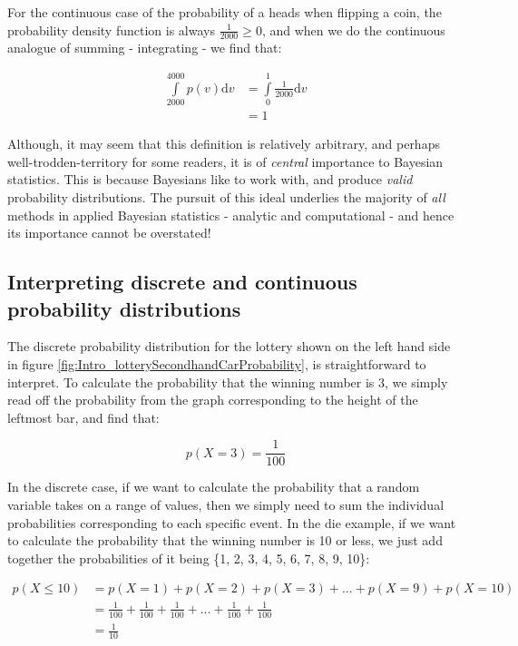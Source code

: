 \documentclass[11pt,fullpage]{book}
\begin{document}
For the continuous case of the probability of a heads when flipping a coin, the probability density function is always $\frac{1}{2000}\geq 0$, and when we do the continuous analogue of summing - integrating - we find that:

\begin{equation}
\begin{align}
\int\limits_{2000}^{4000} p(v) \mathrm{d}v &= \int\limits_{0}^{1} \frac{1}{2000} \mathrm{d}v\\
&= 1
\end{align}
\end{equation}

Although, it may seem that this definition is relatively arbitrary, and perhaps well-trodden-territory for some readers, it is of \textit{central} importance to Bayesian statistics. This is because Bayesians like to work with, and produce \textit{valid} probability distributions. The pursuit of this ideal underlies the majority of \textit{all} methods in applied Bayesian statistics - analytic and computational - and hence its importance cannot be overstated!

\subsection{Interpreting discrete and continuous probability distributions}
The discrete probability distribution for the lottery shown on the left hand side in figure \ref{fig:Intro_lotterySecondhandCarProbability}, is straightforward to interpret. To calculate the probability that the winning number is 3, we simply read off the probability from the graph corresponding to the height of the leftmost bar, and find that:

\begin{equation}
p(X=3)= \frac{1}{100}
\end{equation}

In the discrete case, if we want to calculate the probability that a random variable takes on a range of values, then we simply need to sum the individual probabilities corresponding to each specific event. In the die example, if we want to calculate the probability that the winning number is 10 or less, we just add together the probabilities of it being \{1, 2, 3, 4, 5, 6, 7, 8, 9, 10\}:

\begin{equation}
\begin{align}
p(X\leq 10) &= p(X=1) + p(X=2) + p(X=3) + ... + p(X=9) + p(X=10)\\
&= \frac{1}{100} + \frac{1}{100} + \frac{1}{100} + ... + \frac{1}{100} + \frac{1}{100}\\
&= \frac{1}{10}
\end{align}
\end{equation}
\end{document}
